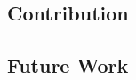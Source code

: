 \subsection{Contribution}

\subsection{Future Work}

\begin{comment}
    \item[Microgrid setup (C1):] In general, an explicit objective, a definition of the market 
     participants and the form of the traded energy must be well defined. 
     A LEM can have different, often contradictory objectives. Especially in the
     design of the market mechanism, the implementation of the objective plays an important role.
     Next, a significant number of market participants is needed, who trade energy among each other.
     Moreover, a part of the market participants needs to be able to produce energy. 
     Finally, the form of the traded energy must be described, for example electricity, heat or a 
     combination of them. Additionally, the way of energy transportation must be specified.
     Will be the traditional energy grid used or a physical microgrid build. 
    
    \item[Grid connection (C2:)] The connection points to the superordinate main grid 
     must be well defined. These points measure the energy flows towards the main grid 
     and evaluate the performance of the LEM and can help to balance the energy generation 
     and demand within it. Besides, you have to distinguish between a physical microgrid and 
     a virtual microgrid. A physical microgrid bring along a power distribution grid and is able
     decouple from the main grid, whereas a virtual microgrid simply connects all participants over 
     an information system (C3). Consequently, a virtual microgrid does not have the opportunity
     to physically decouple from the main grid. 
     Nevertheless, to operate in island-mode extensively, a physical microgrid need a large 
     amount of own energy generation capacity and flexibility to ensure supply security and robustness.
         
    \item[Information system (C3):] In addition, all participants must be connected to each other
    and a market platform that monitor all operations must be provided. 
    Therefore, a information system is needed, which should enable equal 
    access for every market participant to avoid discrimination. 
    With reference to \shortciteA{mengelkamp2018designing}, these requirements
    can be implemented by blockchain technology based on smart contracts.
    

\end{comment}

